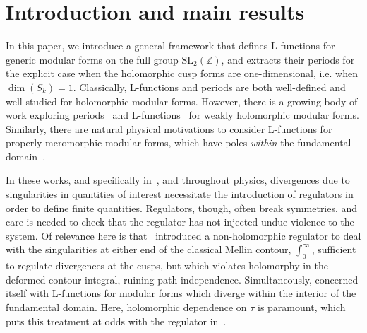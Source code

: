 \documentclass[11pt]{article}
\numberwithin{equation}{section}  %
\newcommand{\ZZ}{\mathbb{Z}}
\newcommand{\SLZ}{\mathrm{SL}_2(\ZZ)}
\begin{document}
%
 
\section{Introduction and main results}\label{sec:intro}\label{sec:intro-results}
 
In this paper, we introduce a general framework that defines L-functions for
generic modular forms on the full group $\SLZ$, and extracts their periods for
the explicit case when the holomorphic cusp forms are one-dimensional, i.e.
when $\dim(S_k) = 1$. Classically, L-functions and periods are both well-defined
and well-studied for holomorphic modular forms. However, there is a growing
body of work exploring periods~\cite{Brown2017} and L-functions~\cite{BFK2011}
for weakly holomorphic modular forms. Similarly, there are natural physical
motivations to consider L-functions for properly meromorphic modular forms,
which have poles \emph{within} the fundamental domain~\cite{1806}.
 
In these works, and specifically in~\cite{BFK2011, 1806}, and throughout physics,
divergences due to singularities in quantities of interest necessitate the
introduction of regulators in order to define finite quantities. Regulators, though,
often break symmetries, and care is needed to check that the regulator has not
injected undue violence to the system. Of relevance here is that~\cite{BFK2011}
introduced a non-holomorphic regulator to deal with the singularities at either
end of the classical Mellin contour, $\int_0^\infty$, sufficient to regulate
divergences at the cusps, but which violates holomorphy in the deformed
contour-integral, ruining path-independence. Simultaneously, \cite{1806}
concerned itself with L-functions for modular forms which diverge within the
interior of the fundamental domain. Here, holomorphic dependence on $\tau$
is paramount, which puts this treatment at odds with the regulator in~\cite{BFK2011}.
 
\end{document}
